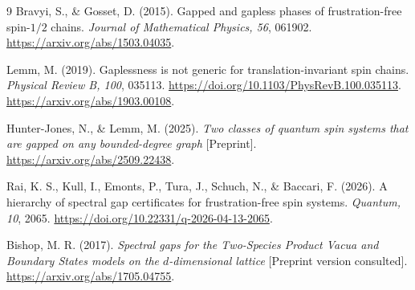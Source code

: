 \documentclass[11pt,a4paper]{article}
\theoremstyle{remark}\newtheorem{remark}[theorem]{Remark}
\begin{document}
\begin{thebibliography}{9}
Bravyi, S., \& Gosset, D. (2015).
Gapped and gapless phases of frustration-free spin-$1/2$ chains.
\emph{Journal of Mathematical Physics, 56}, 061902.
\url{https://arxiv.org/abs/1503.04035}.

Lemm, M. (2019).
Gaplessness is not generic for translation-invariant spin chains.
\emph{Physical Review B, 100}, 035113.
\url{https://doi.org/10.1103/PhysRevB.100.035113}.
\url{https://arxiv.org/abs/1903.00108}.

Hunter-Jones, N., \& Lemm, M. (2025).
\emph{Two classes of quantum spin systems that are gapped on any bounded-degree graph} [Preprint].
\url{https://arxiv.org/abs/2509.22438}.

Rai, K. S., Kull, I., Emonts, P., Tura, J., Schuch, N., \& Baccari, F. (2026).
A hierarchy of spectral gap certificates for frustration-free spin systems.
\emph{Quantum, 10}, 2065.
\url{https://doi.org/10.22331/q-2026-04-13-2065}.

Bishop, M. R. (2017).
\emph{Spectral gaps for the Two-Species Product Vacua and Boundary States models on the $d$-dimensional lattice} [Preprint version consulted].
\url{https://arxiv.org/abs/1705.04755}.
\end{thebibliography}
\end{document}
